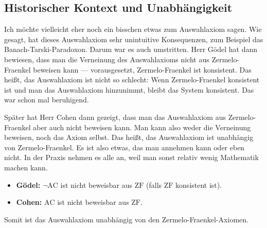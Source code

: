 \begin{ai-global-state-checkpoint-invisible-content}
\end{ai-global-state-checkpoint-invisible-content}

\subsection{Historischer Kontext und Unabhängigkeit}

\begin{spoken-clean}[01:04:40 - 01:06:40]
Ich möchte vielleicht eher noch ein bisschen etwas zum Auswahlaxiom sagen. Wie gesagt, hat dieses Auswahlaxiom sehr unintuitive Konsequenzen, zum Beispiel das Banach-Tarski-Paradoxon. Darum war es auch umstritten. Herr Gödel hat dann bewiesen, dass man die Verneinung des Auswahlaxioms nicht aus Zermelo-Fraenkel beweisen kann --- vorausgesetzt, Zermelo-Fraenkel ist konsistent. Das heißt, das Auswahlaxiom ist nicht so schlecht: Wenn Zermelo-Fraenkel konsistent ist und man das Auswahlaxiom hinzunimmt, bleibt das System konsistent. Das war schon mal beruhigend.

Später hat Herr Cohen dann gezeigt, dass man das Auswahlaxiom aus Zermelo-Fraenkel aber auch nicht beweisen kann. Man kann also weder die Verneinung beweisen, noch das Axiom selbst. Das heißt, das Auswahlaxiom ist unabhängig von Zermelo-Fraenkel. Es ist also etwas, das man annehmen kann oder eben nicht. In der Praxis nehmen es alle an, weil man sonst relativ wenig Mathematik machen kann.
\end{spoken-clean}

\begin{math-stroke}
\begin{remark}
\begin{itemize}
    \item \textbf{Gödel:} $\neg \text{AC}$ ist nicht beweisbar aus $\text{ZF}$ (falls $\text{ZF}$ konsistent ist).
    \item \textbf{Cohen:} $\text{AC}$ ist nicht beweisbar aus $\text{ZF}$.
\end{itemize}
Somit ist das Auswahlaxiom unabhängig von den Zermelo-Fraenkel-Axiomen.
\end{remark}
\end{math-stroke}

